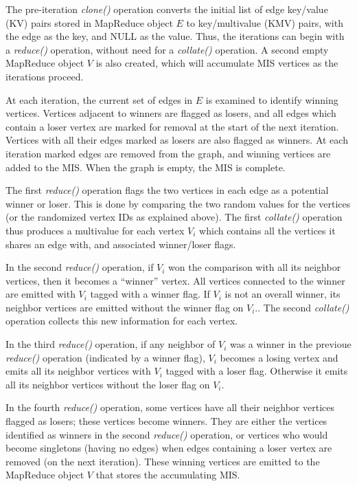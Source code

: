 The pre-iteration {\it clone()} operation converts the initial list of
edge key/value (KV) pairs stored in MapReduce object $E$ to
key/multivalue (KMV) pairs, with the edge as the key, and NULL as the
value.  Thus, the iterations can begin with a {\it reduce()}
operation, without need for a {\it collate()} operation.  A second
empty MapReduce object $V$ is also created, which will accumulate MIS
vertices as the iterations proceed.

At each iteration, the current set of edges in $E$ is examined to
identify winning vertices.  Vertices adjacent to winners are flagged
as losers, and all edges which contain a loser vertex are marked for
removal at the start of the next iteration.  Vertices with all their
edges marked as losers are also flagged as winners.  At each iteration
marked edges are removed from the graph, and winning vertices are
added to the MIS.  When the graph is empty, the MIS is complete.

The first {\it reduce()} operation flags the two vertices in each edge
as a potential winner or loser.  This is done by comparing the two
random values for the vertices (or the randomized vertex IDs as
explained above).  The first {\it collate()} operation thus produces a
multivalue for each vertex $V_i$ which contains all the vertices it
shares an edge with, and associated winner/loser flags.

In the second {\it reduce()} operation, if $V_i$ won the comparison
with all its neighbor vertices, then it becomes a ``winner'' vertex.
All vertices connected to the winner are emitted with $V_i$ tagged
with a winner flag.  If $V_i$ is not an overall winner, its neighbor
vertices are emitted without the winner flag on $V_i$..  The second
{\it collate()} operation collects this new information for each
vertex.

In the third {\it reduce()} operation, if any neighbor of $V_i$ was a
winner in the previoue {\it reduce()} operation (indicated by a winner
flag), $V_i$ becomes a losing vertex and emits all its neighbor
vertices with $V_i$ tagged with a loser flag.  Otherwise it emits all
its neighbor vertices without the loser flag on $V_i$.

In the fourth {\it reduce()} operation, some vertices have all their
neighbor vertices flagged as losers; these vertices become winners.
They are either the vertices identified as winners in the second {\it
reduce()} operation, or vertices who would become singletons (having
no edges) when edges containing a loser vertex are removed (on the
next iteration).  These winning vertices are emitted to the MapReduce
object $V$ that stores the accumulating MIS.

